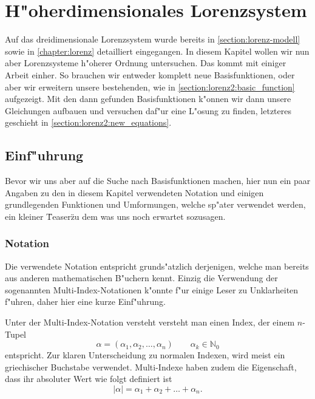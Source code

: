 %
%
%
\chapter{H"oherdimensionales Lorenzsystem\label{chapter:lorenz2}}
\begin{refsection}

Auf das dreidimensionale Lorenzsystem wurde bereits in 
\cref{section:lorenz-modell} sowie in \cref{chapter:lorenz} detailliert 
eingegangen. In diesem Kapitel wollen wir nun aber Lorenzsysteme h"oherer 
Ordnung untersuchen. Das kommt mit einiger Arbeit einher. So brauchen wir 
entweder komplett neue Basisfunktionen, oder aber wir erweitern unsere 
bestehenden, wie in \cref{section:lorenz2:basic_function} aufgezeigt. Mit den 
dann gefunden Basisfunktionen k"onnen wir dann unsere Gleichungen aufbauen und 
versuchen daf"ur eine L"osung zu finden, letzteres geschieht in 
\cref{section:lorenz2:new_equations}.

\section{Einf"uhrung}

Bevor wir uns aber auf die Suche nach Basisfunktionen machen, hier nun ein paar 
Angaben zu den in diesem Kapitel verwendeten Notation und einigen grundlegenden 
Funktionen und Umformungen, welche sp"ater verwendet werden, ein kleiner 
\"Teaser\" zu dem was uns noch erwartet sozusagen.

\subsection{Notation}
Die verwendete Notation entspricht grunds"atzlich derjenigen, welche man 
bereits aus anderen mathematischen B"uchern kennt. Einzig die Verwendung der 
sogenannten Multi-Index-Notationen k"onnte f"ur einige Leser zu Unklarheiten 
f"uhren, daher hier eine kurze Einf"uhrung.

Unter der Multi-Index-Notation versteht versteht man einen Index, der einem 
$n$-Tupel
\begin{equation*}
	\alpha = (\alpha_1, \alpha_2, \dotsc, \alpha_n) \qquad \alpha_k \in 
	\mathbb{N}_{0}
\end{equation*}
entspricht. Zur klaren Unterscheidung zu normalen Indexen, wird meist ein 
griechischer Buchstabe verwendet. Multi-Indexe haben zudem die Eigenschaft, 
dass ihr absoluter Wert wie folgt definiert ist
\begin{equation*}
	|\alpha| = \alpha_1 + \alpha_2 + \dots + \alpha_n.
\end{equation*}
 

\end{refsection}

